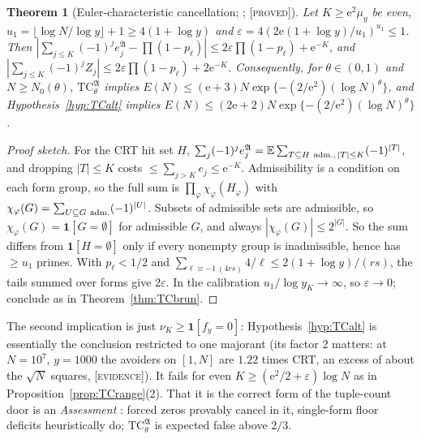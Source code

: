 \documentclass[10pt,reqno]{amsart}
\newtheorem{theorem}{Theorem}[section]
\theoremstyle{definition}
\theoremstyle{remark}
\newcommand{\E}{\mathbb E}
\newcommand{\ind}{\mathbf 1}
\newcommand{\e}{\mathrm e}
\newcommand{\lab}[1]{\textup{[\textsc{#1}]}}
\begin{document}
\begin{theorem}[Euler-characteristic cancellation; {\cite[Thm~4.1, Cor.~4.2]{TU2}}; \lab{proved}]\label{thm:euler}
Let $K\geq\e^2\mu_y$ be even, $u_1=\lfloor\log N/\log y\rfloor+1\geq4(1+\log y)$ and
$\varepsilon=4(2\e(1+\log y)/u_1)^{u_1}\leq1$.  Then
$|\sum_{j\leq K}(-1)^je_j^{\mathfrak A}-\prod(1-p_\ell)|\leq2\varepsilon\prod(1-p_\ell)+\e^{-K}$, and
$|\sum_{j\leq K}(-1)^jZ_j|\leq2\varepsilon\prod(1-p_\ell)+2\e^{-K}$.  Consequently, for
$\theta\in(0,1)$ and $N\geq N_0(\theta)$, $\mathrm{TC}^{\mathfrak A}_\theta$ implies
$E(N)\leq(\e+3)N\exp\{-(2/\e^2)(\log N)^\theta\}$, and Hypothesis~\ref{hyp:TCalt}
implies $E(N)\leq(2\e+2)N\exp\{-(2/\e^2)(\log N)^\theta\}$.
\end{theorem}
\begin{proof}[Proof sketch]
For the CRT hit set $H$, $\sum_j(-1)^je_j^{\mathfrak A}=\E\sum_{T\subseteq H\ {\rm adm.},\,|T|\leq K}(-1)^{|T|}$,
and dropping $|T|\leq K$ costs $\leq\sum_{j>K}e_j\leq\e^{-K}$.  Admissibility is a
condition on each form group, so the full sum is $\prod_\varphi\chi_\varphi(H_\varphi)$ with
$\chi_\varphi(G)=\sum_{U\subseteq G\ {\rm adm.}}(-1)^{|U|}$.  Subsets of admissible sets are
admissible, so $\chi_\varphi(G)=\ind[G=\emptyset]$ for admissible $G$, and always
$|\chi_\varphi(G)|\leq2^{|G|}$.  So the sum differs from $\ind[H=\emptyset]$ only if every
nonempty group is inadmissible, hence has $\geq u_1$ primes.  With $p_\ell<1/2$
and $\sum_{\ell\equiv-1\,(4rs)}4/\ell\leq2(1+\log y)/(rs)$, the tails summed over forms give
$2\varepsilon$.  In the calibration $u_1/\log y_K\to\infty$, so $\varepsilon\to0$; conclude as in
Theorem~\ref{thm:TCbrun}.
\end{proof}
The second implication is just $\nu_K\geq\ind[f_y=0]$: Hypothesis~\ref{hyp:TCalt}
is essentially the conclusion restricted to one majorant (its factor $2$
matters: at $N=10^7$, $y=1000$ the avoiders on $[1,N]$ are $1.22$ times CRT,
an excess of about the $\sqrt N$ squares, \lab{evidence}).  It fails for even
$K\geq(\e^2/2+\varepsilon)\log N$ as in Proposition~\ref{prop:TCrange}(2).  That it is the
correct form of the tuple-count door is an \emph{Assessment}
\cite[\S4]{TU2}: forced zeros provably cancel in it, single-form floor
deficits heuristically do; $\mathrm{TC}^{\mathfrak A}_\theta$ is expected false above $2/3$.
\end{document}
